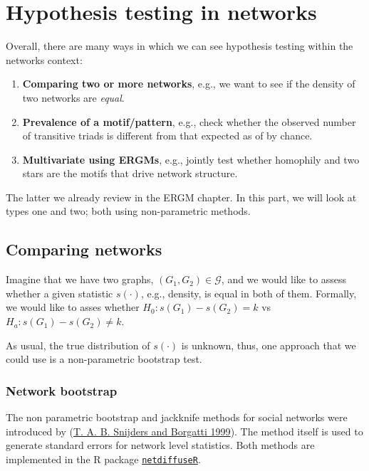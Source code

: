 \documentclass[
]{book}
\begin{document}
\hypertarget{hypothesis-testing-in-networks}{%
\chapter{Hypothesis testing in networks}\label{hypothesis-testing-in-networks}}

Overall, there are many ways in which we can see hypothesis testing within
the networks context:

\begin{enumerate}
\def\labelenumi{\arabic{enumi}.}
\item
  \textbf{Comparing two or more networks}, e.g., we want to see if the density of
  two networks are \emph{equal}.
\item
  \textbf{Prevalence of a motif/pattern}, e.g., check whether the observed number
  of transitive triads is different from that expected as of by chance.
\item
  \textbf{Multivariate using ERGMs}, e.g., jointly test whether homophily and
  two stars are the motifs that drive network structure.
\end{enumerate}

The latter we already review in the ERGM chapter. In this part, we will look
at types one and two; both using non-parametric methods.

\hypertarget{comparing-networks}{%
\section{Comparing networks}\label{comparing-networks}}

Imagine that we have two graphs, \((G_1,G_2) \in \mathcal{G}\), and we would like
to assess whether a given statistic \(s(\cdot)\), e.g., density, is equal in both of them.
Formally, we would like to asses whether \(H_0: s(G_1) - s(G_2) = k\) vs
\(H_a: s(G_1) - s(G_2) \neq k\).

As usual, the true distribution of \(s(\cdot)\) is unknown, thus, one approach that
we could use is a non-parametric bootstrap test.

\hypertarget{network-bootstrap}{%
\subsection{Network bootstrap}\label{network-bootstrap}}

The non parametric bootstrap and jackknife methods for social networks were
introduced by (\protect\hyperlink{ref-Snijders1999}{T. A. B. Snijders and Borgatti 1999}). The method itself is used to generate standard
errors for network level statistics. Both methods are implemented in the R
package \href{https://cran.r-project.org/package=netdiffuseR}{\texttt{netdiffuseR}}.
\end{document}
